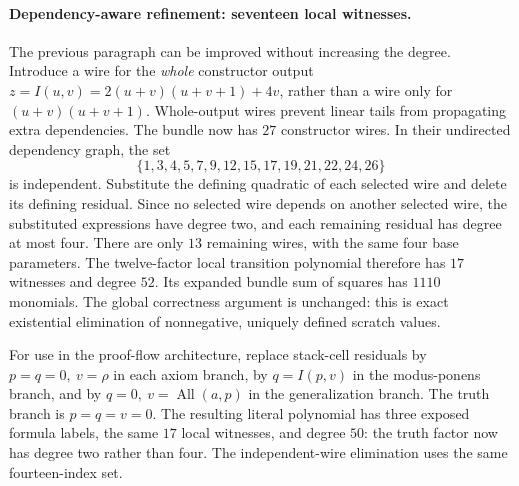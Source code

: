 \paragraph{Dependency-aware refinement: seventeen local witnesses.}
The previous paragraph can be improved without increasing the degree.
Introduce a wire for the \emph{whole} constructor output
$z=I(u,v)=2(u+v)(u+v+1)+4v$, rather than a wire only for
$(u+v)(u+v+1)$. Whole-output wires prevent linear tails from propagating
extra dependencies. The bundle now has $27$ constructor wires. In their
undirected dependency graph, the set
\[
 \{1,3,4,5,7,9,12,15,17,19,21,22,24,26\}
\]
is independent. Substitute the defining quadratic of each selected wire
and delete its defining residual. Since no selected wire depends on
another selected wire, the substituted expressions have degree two, and
each remaining residual has degree at most four. There are only $13$
remaining wires, with the same four base parameters. The twelve-factor
local transition polynomial therefore has $17$ witnesses and degree $52$.
Its expanded bundle sum of squares has $1110$ monomials.
The global correctness argument is unchanged: this is exact existential
elimination of nonnegative, uniquely defined scratch values.

For use in the proof-flow architecture, replace stack-cell residuals by
$p=q=0,\ v=\rho$ in each axiom branch, by $q=I(p,v)$ in the modus-ponens
branch, and by $q=0,\ v=\operatorname{All}(a,p)$ in the generalization
branch. The truth branch is $p=q=v=0$. The resulting literal polynomial
has three exposed formula labels, the same $17$ local witnesses, and
degree $50$: the truth factor now has degree two rather than four.
The independent-wire elimination uses the same fourteen-index set.
